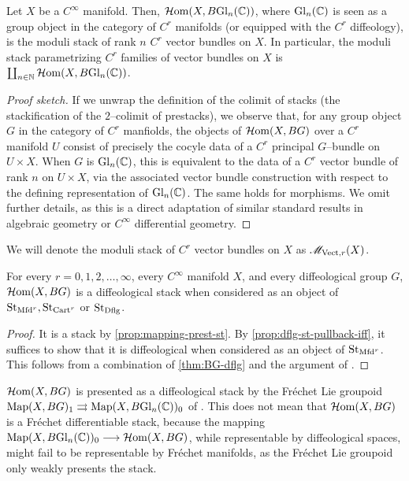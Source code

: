 \documentclass[11pt]{amsart}
\begin{document}
\begin{thm}\label{thm:map-X-BGl-mod-st-vec-bun}
Let $X$ be a $C^\infty$ manifold. Then, $\mathcal{H}\mathrm{om}(X, B\mathrm{Gl}_n(\mathbb{C}))$, where $\mathrm{Gl}_n(\mathbb{C})$ is seen as a
group object in the category of $C^r$ manifolds (or equipped with the $C^r$ diffeology), is the
moduli stack of rank $n$ $C^r$ vector bundles on $X$. In particular, the moduli stack parametrizing
$C^r$ families of vector bundles on $X$ is $\coprod_{n \in \mathbb{N}} \mathcal{H}\mathrm{om}(X, B\mathrm{Gl}_n(\mathbb{C}))$.
\end{thm}
\begin{proof}[Proof sketch]
If we unwrap the definition of the colimit of stacks (the stackification
\cite[\href{https://stacks.math.columbia.edu/tag/02ZN}{Lemma 02ZN}]{stacks-project}
of the $2$--colimit of prestacks), we observe that, for any group object $G$ in the category of
$C^r$ manfiolds, the objects of $\mathcal{H}\mathrm{om}(X, BG)$ over a $C^r$ manifold $U$ consist of precisely the
cocyle data of a $C^r$ principal $G$--bundle on $U \times X$. When $G$ is $\mathrm{Gl}_n(\mathbb{C})$, this is
equivalent to the data of a $C^r$ vector bundle of rank $n$ on $U \times X$, via the associated
vector bundle construction with respect to the defining representation of $\mathrm{Gl}_n(\mathbb{C})$.
The same holds for morphisms.
We omit further details, as this is a direct adaptation of similar standard results in algebraic
geometry or $C^\infty$ differential geometry.
\end{proof}

\begin{defn}
We will denote the moduli stack of $C^r$ vector bundles on $X$ as $\mathscr{M}_{\mathrm{Vect}, r}(X)$.
\end{defn}

\begin{thm}\label{thm:map-X-BG-dflg}
For every $r = 0, 1, 2, \dots, \infty$, every $C^\infty$ manifold $X$, and every
diffeological group $G$, $\mathcal{H}\mathrm{om}(X, BG)$ is a diffeological stack when considered as an object of
$\mathrm{St}_{\mathrm{Mfd}^r}, \mathrm{St}_{\mathrm{Cart}^r}$ or $\mathrm{St}_{\mathrm{Dflg}}$.
\end{thm}
\begin{proof}
It is a stack by \cref{prop:mapping-prest-st}.
By \cref{prop:dflg-st-pullback-iff}, it suffices to show that it is diffeological
when considered as an object of $\mathrm{St}_{\mathrm{Mfd}^r}$. This follows from a combination
of \cref{thm:BG-dflg} and the argument of \cite[Theorem 4.2, and the following paragraph]{RV18}.
\end{proof}

\begin{rmk}\label{rmk:Frechet-Lie-groupoid-weak-presentation}
$\mathcal{H}\mathrm{om}(X, BG)$ is presented as a diffeological stack by the Fr\'echet Lie groupoid
$\mathrm{Map}(X, BG)_1 \rightrightarrows \mathrm{Map}(X, B\mathrm{Gl}_n(\mathbb{C}))_0$ of
\cite[2]{RV18HomStack}. This does not mean that $\mathcal{H}\mathrm{om}(X, BG)$ is a Fr\'echet differentiable
stack, because the mapping $\Map(X, B\Gl_n(\bC))_0 \to \HHom(X, BG)$, while representable by
diffeological spaces, might fail to be representable by Fr\'echet manifolds, as the Fr\'echet Lie
groupoid only weakly presents the stack.
\end{rmk}
\end{document}
